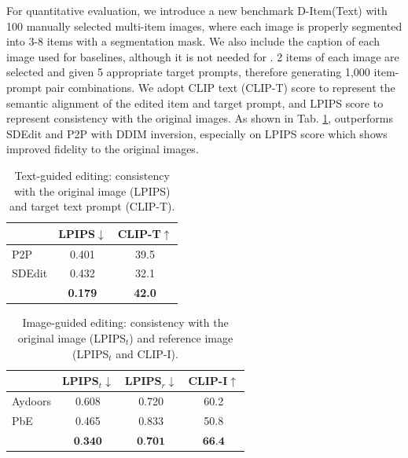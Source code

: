 For quantitative evaluation, we introduce a new benchmark D-Item(Text) with 100 manually selected multi-item images, where each image is properly segmented into 3-8 items with a segmentation mask. We also include the caption of each image used for baselines, although it is not needed for \dedit{}.
2 items of each image are selected and given 5 appropriate target prompts, therefore generating 1,000 item-prompt pair combinations.
We adopt CLIP text (CLIP-T) score to represent the semantic alignment of the edited item and target prompt, and LPIPS score to represent consistency with the original images.
As shown in Tab. \ref{tab::text}, \dedit{} outperforms SDEdit \cite{meng2021sdedit} and P2P with DDIM inversion, especially on LPIPS score which shows improved fidelity to the original images.







\begin{table}[h]
\centering
\caption{Text-guided editing: consistency with the original image (LPIPS) and target text prompt (CLIP-T).}

\begin{tabular}{lcc} 
\toprule
       & LPIPS$\downarrow$               & CLIP-T$\uparrow$                 \\ 
\midrule
P2P    & 0.401                           & 39.5                           \\
SDEdit & 0.432                           & 32.1                            \\
\dedit{} & \textbf{0.179} & \textbf{42.0}  \\
\bottomrule
\end{tabular}

\vspace{-5pt}
\label{tab::text}
\end{table}




\begin{table}[h]
\centering
\caption{ Image-guided editing: consistency with the original image (LPIPS$_t$) and reference image (LPIPS$_t$ and CLIP-I).}
\begin{tabular}{lccc} 
\toprule
                 & LPIPS$_t$$\downarrow$ & LPIPS$_r$$\downarrow$ & CLIP-I$\uparrow$  \\ 
\midrule
Aydoors          & 0.608                & 0.720                & 60.2              \\
PbE & 0.465                & 0.833                & 50.8              \\
\dedit{}           & $\textbf{0.340}$     & $\textbf{0.701}$     & $\textbf{66.4}$   \\
\bottomrule
\end{tabular}
\label{tab::image_scores}
\end{table}


